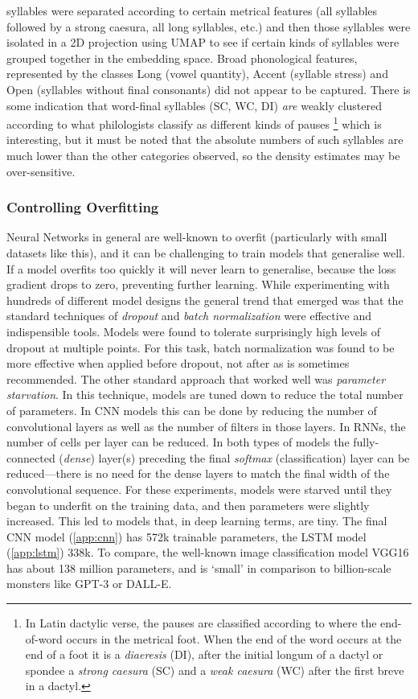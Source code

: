 \documentclass[
    twocolumn,
    hf,
]{ceurart}
\begin{document}
%
syllables were separated according to certain metrical features (all syllables
followed by a strong caesura, all long syllables, etc.) and then those syllables
were isolated in a 2D projection using UMAP \cite{mcinnes_umap_2018} to see if
certain kinds of syllables were grouped together in the embedding space. Broad
phonological features, represented by the classes Long (vowel quantity), Accent
(syllable stress) and Open (syllables without final consonants) did not appear
to be captured. There is some indication that word-final syllables (SC, WC, DI)
\emph{are} weakly clustered according to what philologists classify as different
kinds of pauses%
%
\footnote{In Latin dactylic verse, the pauses are classified according to where
    the end-of-word occurs in the metrical foot. When the end of the word occurs
    at the end of a foot it is a \emph{diaeresis} (DI), after the initial longum
    of a dactyl or spondee a \emph{strong caesura} (SC) and a \emph{weak
        caesura} (WC) after the first breve in a dactyl.}
%
which is interesting, but it must be noted that the absolute numbers of such
syllables are much lower than the other categories observed, so the density
estimates may be over-sensitive.

\subsubsection{Controlling Overfitting}

Neural Networks in general are well-known to overfit (particularly with small
datasets like this), and it can be challenging to train models that generalise
well. If a model overfits too quickly it will never learn to generalise, because
the loss gradient drops to zero, preventing further learning. While
experimenting with hundreds of different model designs the general trend that
emerged was that the standard techniques of \emph{dropout} and \emph{batch
    normalization} were effective and indispensible tools. Models were found to
tolerate surprisingly high levels of dropout at multiple points. For this task,
batch normalization was found to be more effective when applied before dropout,
not after as is sometimes recommended. The other standard approach that worked
well was \emph{parameter starvation}. In this technique, models are tuned down
to reduce the total number of parameters. In CNN models this can be done by
reducing the number of convolutional layers as well as the number of filters in
those layers. In RNNs, the number of cells per layer can be reduced. In both
types of models the fully-connected (\emph{dense}) layer(s) preceding the final
\emph{softmax} (classification) layer can be reduced---there is no need for the
dense layers to match the final width of the convolutional sequence. For these
experiments, models were starved until they began to underfit on the training
data, and then parameters were slightly increased. This led to models that, in
deep learning terms, are tiny. The final CNN model (\ref{app:cnn}) has 572k
trainable parameters, the LSTM model (\ref{app:lstm}) 338k. To compare, the
well-known image classification model VGG16 \cite{vgg16} has about 138 million
parameters, and is `small' in comparison to billion-scale monsters like GPT-3 or
DALL-E.
\end{document}

